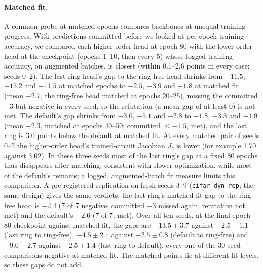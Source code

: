 \paragraph{Matched fit.} A common probe at matched epochs compares backbones at unequal training progress. With predictions
committed before we looked at per-epoch training accuracy, we compared each higher-order head at epoch 80 with the lower-order head
at the checkpoint (epochs 1--10, then every 5) whose logged training accuracy, on augmented batches, is closest (within 0.1--2.6
points in every case; seeds 0--2). The last-ring head's gap to the ring-free head shrinks from $-11.5$, $-15.2$ and $-11.5$ at matched epochs to
$-2.5$, $-3.9$ and $-1.8$ at matched fit (mean $-2.7$, the ring-free head matched at epochs 20--25), missing the committed $-3$ but negative in every
seed, so the refutation (a mean gap of at least 0) is not met. The default's gap shrinks from $-3.0$, $-5.1$ and $-2.8$ to $-1.8$, $-3.3$ and $-1.9$
(mean $-2.3$, matched at epochs 40--50; committed $\le-1.5$, met), and the last ring is $3.0$ points below the default at matched fit. At
every matched pair of seeds 0--2 the higher-order head's trained-circuit Jacobian $J_c$ is lower (for example 1.70 against 3.02). In these three seeds most of the
last ring's gap at a fixed 80 epochs thus disappears after matching, consistent with slower optimization, while most of the default's remains; a logged, augmented-batch fit measure limits this comparison. A pre-registered replication on fresh seeds 3--9 (\texttt{cifar\_dyn\_rep}, the same design) gives the same verdicts: the last ring's matched-fit gap to the ring-free head is $-2.4$ (7 of 7 negative; committed $-3$ missed again, refutation not met) and the default's $-2.6$ (7 of 7; met). Over all ten seeds, at the final epoch-80 checkpoint against matched fit, the gaps are $-13.5\pm3.7$ against $-2.5\pm1.1$ (last ring to ring-free), $-4.5\pm2.1$ against $-2.5\pm0.8$ (default to ring-free) and $-9.0\pm2.7$ against $-2.5\pm1.4$ (last ring to default), every one of the 30 seed comparisons negative at matched fit. The matched points lie at different fit levels, so these gaps do not add.

